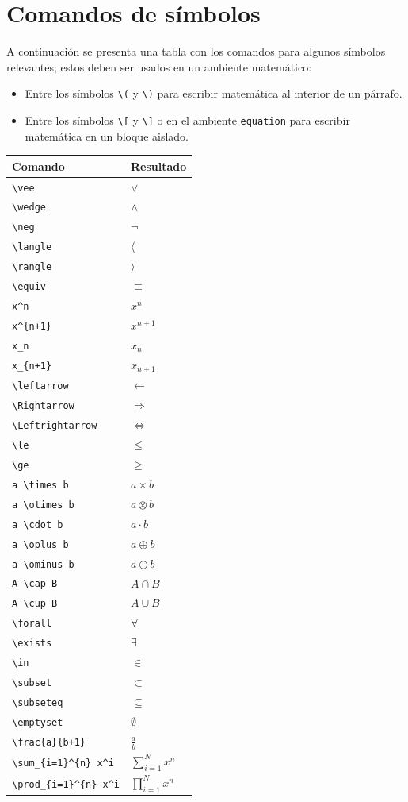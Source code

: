 \section{Comandos de símbolos}
A continuación se presenta una tabla con los comandos para algunos símbolos relevantes; estos deben ser usados en un ambiente matemático:
\begin{itemize}
  \item Entre los símbolos \verb|\(| y \verb|\)| para escribir matemática al interior de un párrafo.
  \item Entre los símbolos \verb|\[| y \verb|\]| o en el ambiente \texttt{equation} para escribir matemática en un bloque aislado.
\end{itemize}

\begin{center}
\begin{tabular}{@{}ll@{}}
\toprule
Comando & Resultado \\ \midrule
\verb|\vee| & $\vee$ \\
\verb|\wedge| & $\wedge$ \\
\verb|\neg| & $\neg$ \\
\verb|\langle| & $\langle$ \\
\verb|\rangle| & $\rangle$ \\
\verb|\equiv| & $\equiv$ \\
\verb|x^n| & $x^n$ \\
\verb|x^{n+1}| & $x^{n+1}$ \\
\verb|x_n| & $x_n$ \\
\verb|x_{n+1}| & $x_{n+1}$ \\
\verb|\leftarrow| & $\leftarrow$ \\
\verb|\Rightarrow| & $\Rightarrow$ \\
\verb|\Leftrightarrow| & $\Leftrightarrow$ \\
\verb|\le| & $\le$ \\
\verb|\ge| & $\ge$ \\
\verb|a \times b| & $a \times b$ \\
\verb|a \otimes b| & $a \otimes b$ \\
\verb|a \cdot b| & $a \cdot b$ \\
\verb|a \oplus b| & $a \oplus b$ \\
\verb|a \ominus b| & $a \ominus b$ \\
\verb|A \cap B| & $A \cap B$ \\
\verb|A \cup B| & $A \cup B$ \\
\verb|\forall| & $\forall$ \\
\verb|\exists| & $\exists$ \\
\verb|\in| & $\in$ \\
\verb|\subset| & $\subset$ \\
\verb|\subseteq| & $\subseteq$ \\
\verb|\emptyset| & $\emptyset$ \\
\verb|\frac{a}{b+1}| & $\frac{a}{b}$ \\
\verb|\sum_{i=1}^{n} x^i| & $\sum\limits_{i=1}^{N} x^n$ \\
\verb|\prod_{i=1}^{n} x^i| & $\prod\limits_{i=1}^{N} x^n$ \\
\bottomrule
\end{tabular}
\end{center}
